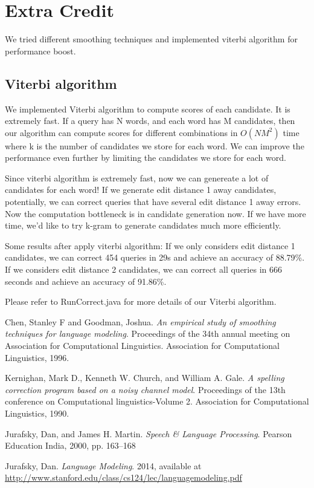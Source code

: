 \documentclass{article}
\begin{document}
\section{Extra Credit}

We tried different smoothing techniques and implemented viterbi algorithm for performance boost.

\subsection{Viterbi algorithm}

We implemented Viterbi algorithm to compute scores of each candidate. It is extremely fast. If a query has N words, and each word has M candidates, then our algorithm can compute scores for different combinations in $O(NM^2)$ time where k is the number of candidates we store for each word. We can improve the performance even further by limiting the candidates we store for each word.

Since viterbi algorithm is extremely fast, now we can genereate a lot of candidates for each word! If we generate edit distance 1 away candidates, potentially, we can correct queries that have several edit distance 1 away errors. Now the computation bottleneck is in candidate generation now. If we have more time, we'd like to try k-gram to generate candidates much more efficiently.

Some results after apply viterbi algorithm: If we only considers edit distance 1 candidates, we can correct 454 queries in 29s and achieve an accuracy of 88.79\%. If we considers edit distance 2 candidates, we can correct all queries in 666 seconds and achieve an accuracy of 91.86\%.

Please refer to RunCorrect.java for more details of our Viterbi algorithm.

\begin{thebibliography}{9}

    Chen, Stanley F and Goodman, Joshua.
    \emph{An empirical study of smoothing techniques for language modeling}.
    Proceedings of the 34th annual meeting on Association for Computational Linguistics. Association for Computational Linguistics, 1996.

    Kernighan, Mark D., Kenneth W. Church, and William A. Gale.
    \emph{A spelling correction program based on a noisy channel model}.
    Proceedings of the 13th conference on Computational linguistics-Volume 2. Association for Computational Linguistics, 1990.

    Jurafsky, Dan, and James H. Martin.
    \emph{Speech \& Language Processing}.
    Pearson Education India, 2000, pp. 163--168

    Jurafsky, Dan.
    \emph{Language Modeling}.
    2014, available at \url{http://www.stanford.edu/class/cs124/lec/languagemodeling.pdf}
\end{thebibliography}
\end{document}
